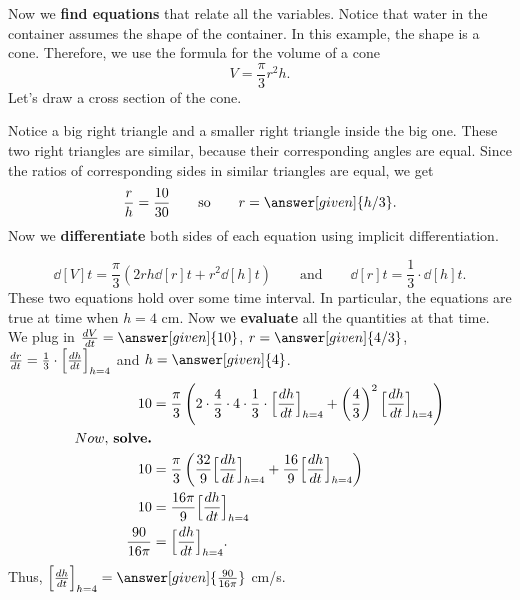 \documentclass{ximera}
\begin{document}
\begin{example}
\begin{explanation}
Now we \textbf{find equations} that relate all the variables. Notice that water in the container assumes the shape of the container. In this example, the shape is a cone. Therefore, we use the formula for the volume of
a cone 
\[
V = \frac{\pi}{3} r^2 h.
\]
Let's draw a cross section of the cone.
\begin{image}
\end{image}
Notice a big right triangle and  a smaller right triangle inside the big one.
These two right triangles are similar, because their corresponding angles are equal.
Since the ratios of corresponding sides in similar triangles are equal, we get
\[
\frac{r}{h}=\frac{10}{30} \qquad\text{so}\qquad r=\answer[given]{h/3}.
\]  
Now we  \textbf{differentiate} both sides of each equation using
implicit differentiation.

\[
\dd[V]{t} = \frac{\pi}{3}\left(2rh \dd[r]{t} + r^2 \dd[h]{t}\right)
\qquad\text{and}\qquad \dd[r]{t} = \frac{1}{3}\cdot \dd[h]{t}.
\]
These two equations hold over some time interval. In particular, the equations are true at time when $h=4$ cm. 
Now we \textbf{evaluate} all the quantities at that time. We plug in $\dd[V]{t} =
\answer[given]{10}$, $r = \answer[given]{4/3}$, $\dd[r]{t} = \frac{1}{3}\cdot \Bigl[\dd[h]{t}\Bigr]_{h=4}$ and
$h=\answer[given]{4}$.
\begin{align*}
10 &= \frac{\pi}{3}\left(2\cdot \frac{4}{3}\cdot 4 \cdot\frac{1}{3}\cdot\Bigl[\dd[h]{t}\Bigr]_{h=4} + \left(\frac{4}{3}\right)^2 \Bigl[\dd[h]{t}\Bigr]_{h=4}\right)\\Now,\hspace{0.025in}\textbf{solve.}\\
10 &= \frac{\pi}{3}\left(\frac{32}{9}\Bigl[\dd[h]{t}\Bigr]_{h=4} + \frac{16}{9} \Bigl[\dd[h]{t}\Bigr]_{h=4}\right)\\ 
10 &= \frac{16\pi}{9}\Bigl[\dd[h]{t}\Bigr]_{h=4}\\
\frac{90}{16\pi} &= \Bigl[\dd[h]{t}\Bigr]_{h=4}.
\end{align*}
Thus, $\Bigl[\dd[h]{t}\Bigr]_{h=4}=\answer[given]{\frac{90}{16\pi}}$ cm/s.
\end{explanation}
\end{example}
\end{document}
